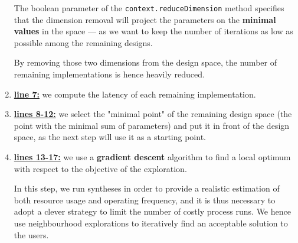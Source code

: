 \begin{enumerate}
                        The boolean parameter of the \lstinline{context.reduceDimension} method specifies that the dimension removal will project the parameters on the {\bf minimal values} in the space --- as we want to keep the number of iterations as low as possible among the remaining designs.

                        By removing those two dimensions from the design space, the number of remaining implementations is hence heavily reduced.%
                    \item \underline{\bf line 7:} we compute the latency of each remaining implementation.
                    \item \underline{\bf lines 8-12:} we select the "minimal point" of the remaining design space (the point with the minimal sum of parameters) and put it in front of the design space, as the next step will use it as a starting point.
                    \item \underline{\bf lines 13-17:} we use a {\bf gradient descent} algorithm to find a local optimum with respect to the objective of the exploration.

                        In this step, we run syntheses in order to provide a realistic estimation of both resource usage and operating frequency, and it is thus necessary to adopt a clever strategy to limit the number of costly process runs.
                        We hence use neighbourhood explorations to iteratively find an acceptable solution to the users.
                \end{enumerate}

